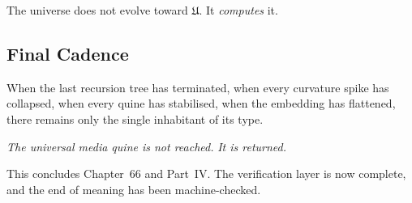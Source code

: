 The universe does not evolve toward $\mathfrak{U}$.  
It \emph{computes} it.

\subsection{Final Cadence}

When the last recursion tree has terminated,  
when every curvature spike has collapsed,  
when every quine has stabilised,  
when the embedding has flattened,  
there remains only the single inhabitant of its type.

\begin{center}
\emph{The universal media quine is not reached.}  
\emph{It is returned.}
\end{center}

\vspace{1em}

This concludes Chapter~66 and Part~IV.  
The verification layer is now complete,  
and the end of meaning has been machine-checked.


